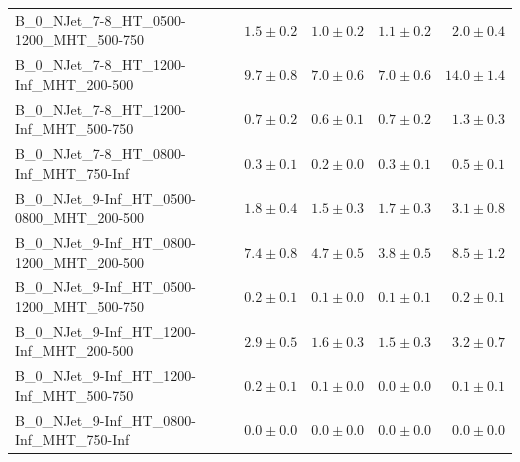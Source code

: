 \documentclass{beamer}
\begin{document}
\begin{frame}
\begin{tabular}{lrrrr}
     B\_0\_NJet\_7-8\_HT\_0500-1200\_MHT\_500-750 &               $1.5\pm0.2$&               $1.0\pm0.2$&               $1.1\pm0.2$&                   $2.0\pm0.4$ \\ 
      B\_0\_NJet\_7-8\_HT\_1200-Inf\_MHT\_200-500 &               $9.7\pm0.8$&               $7.0\pm0.6$&               $7.0\pm0.6$&                  $14.0\pm1.4$ \\ 
      B\_0\_NJet\_7-8\_HT\_1200-Inf\_MHT\_500-750 &               $0.7\pm0.2$&               $0.6\pm0.1$&               $0.7\pm0.2$&                   $1.3\pm0.3$ \\ 
      B\_0\_NJet\_7-8\_HT\_0800-Inf\_MHT\_750-Inf &               $0.3\pm0.1$&               $0.2\pm0.0$&               $0.3\pm0.1$&                   $0.5\pm0.1$ \\ 
   B\_0\_NJet\_9-Inf\_HT\_0500-0800\_MHT\_200-500 &               $1.8\pm0.4$&               $1.5\pm0.3$&               $1.7\pm0.3$&                   $3.1\pm0.8$ \\ 
   B\_0\_NJet\_9-Inf\_HT\_0800-1200\_MHT\_200-500 &               $7.4\pm0.8$&               $4.7\pm0.5$&               $3.8\pm0.5$&                   $8.5\pm1.2$ \\ 
   B\_0\_NJet\_9-Inf\_HT\_0500-1200\_MHT\_500-750 &               $0.2\pm0.1$&               $0.1\pm0.0$&               $0.1\pm0.1$&                   $0.2\pm0.1$ \\ 
    B\_0\_NJet\_9-Inf\_HT\_1200-Inf\_MHT\_200-500 &               $2.9\pm0.5$&               $1.6\pm0.3$&               $1.5\pm0.3$&                   $3.2\pm0.7$ \\ 
    B\_0\_NJet\_9-Inf\_HT\_1200-Inf\_MHT\_500-750 &               $0.2\pm0.1$&               $0.1\pm0.0$&               $0.0\pm0.0$&                   $0.1\pm0.1$ \\ 
    B\_0\_NJet\_9-Inf\_HT\_0800-Inf\_MHT\_750-Inf &               $0.0\pm0.0$&               $0.0\pm0.0$&               $0.0\pm0.0$&                   $0.0\pm0.0$ \\ 

\bottomrule 
\end{tabular}
\end{frame}
\end{document}
